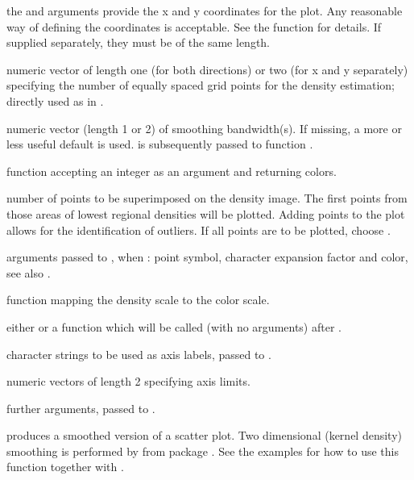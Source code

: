 %
\begin{Arguments}
\begin{ldescription}
\item[\code{x, y}] the  and  arguments provide the x and y
coordinates for the plot.  Any reasonable way of defining the
coordinates is acceptable.  See the function 
for details.  If supplied separately, they must be of the same length.
\item[\code{nbin}] numeric vector of length one (for both directions) or two
(for x and y separately) specifying the number of equally spaced
grid points for the density estimation; directly used as
 in .
\item[\code{bandwidth}] numeric vector (length 1 or 2) of smoothing bandwidth(s).
If missing, a more or less useful default is used. 
is subsequently passed to function
.
\item[\code{colramp}] function accepting an integer  as an argument and
returning  colors.
\item[\code{nrpoints}] number of points to be superimposed on the density
image.  The first  points from those areas of lowest
regional densities will be plotted.  Adding points to the plot
allows for the identification of outliers.  If all points are to be
plotted, choose .
\item[\code{pch, cex, col}] arguments passed to ,
when : point symbol, character expansion factor
and color, see also .
\item[\code{transformation}] function mapping the density scale to the color scale.
\item[\code{postPlotHook}] either  or a function which will be
called (with no arguments) after .
\item[\code{xlab, ylab}] character strings to be used as axis labels, passed
to .
\item[\code{xlim, ylim}] numeric vectors of length 2 specifying axis limits.
\item[\code{xaxs, yaxs, ...}] further arguments, passed to .
\end{ldescription}
\end{Arguments}
%
\begin{Details}\relax
{} produces a smoothed version of a scatter plot.
Two dimensional (kernel density) smoothing is performed by
 from package .
See the examples for how to use this function together with
.
\end{Details}
